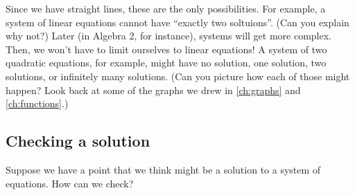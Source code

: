 Since we have straight lines, these are the only possibilities. For example, a system of linear equations cannot have ``exactly two soltuions''. (Can you explain why not?) Later (in Algebra 2, for instance), systems will get more complex. Then, we won't have to limit ourselves to linear equations! A system of two quadratic equations, for example, might have no solution, one solution, two solutions, or infinitely many solutions. (Can you picture how each of those might happen? Look back at some of the graphs we drew in \cref{ch:graphs} and \cref{ch:functions}.)


\subsection{Checking a solution}

Suppose we have a point that we think might be a solution to a system of equations. How can we check?

